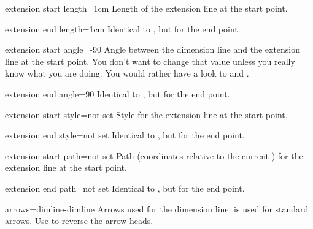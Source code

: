 \documentclass[a4paper]{article}
\begin{document}
\begin{docKey}{extension start length}{=}{1cm}
  Length of the extension line at the start point.
\end{docKey}

\begin{docKey}{extension end length}{=}{1cm}
  Identical to , but for the end point.
\end{docKey}

\begin{docKey}{extension start angle}{=}{-90}
  Angle between the dimension line and the extension line at the start
  point.  You don't want to change that value unless you really know what
  you are doing. You would rather have a look to  and .
\end{docKey}

\begin{docKey}{extension end angle}{=}{90}
  Identical to , but for the end point.
\end{docKey}

\begin{docKey}{extension start style}{=}{not set}
  Style for the extension line at the start point.
\end{docKey}

\begin{docKey}{extension end style}{=}{not set}
  Identical to , but for the end point.
\end{docKey}

\begin{docKey}{extension start path}{=}{not set}
  Path (coordinates relative to the current
  ) for the extension line at the start
  point.
\end{docKey}

\begin{docKey}{extension end path}{=}{not set}
  Identical to , but for the end point.
\end{docKey}


\begin{docKey}{arrows}{=}{dimline-dimline}
  Arrows used for the dimension line.  is used
  for standard arrows. Use  to
  reverse the arrow heads.
\end{docKey}
\end{document}
